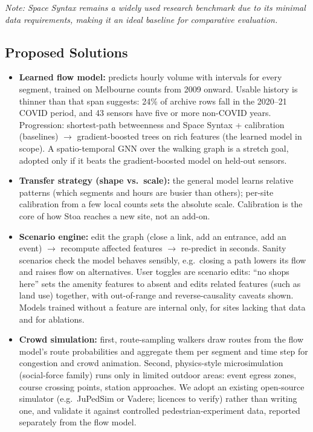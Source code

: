 \documentclass[11pt]{article}
\begin{document}
\textit{Note: Space Syntax remains a widely used research benchmark due to its minimal data requirements, making it an ideal baseline for comparative evaluation.}

\subsection{Proposed Solutions}
\begin{itemize}
  \item \textbf{Learned flow model:} predicts hourly volume with intervals for every segment, trained on Melbourne counts from 2009 onward. Usable history is thinner than that span suggests: 24\% of archive rows fall in the 2020--21 COVID period, and 43 sensors have five or more non-COVID years. Progression: shortest-path betweenness and Space Syntax + calibration (baselines) $\rightarrow$ gradient-boosted trees on rich features (the learned model in scope). A spatio-temporal GNN over the walking graph is a stretch goal, adopted only if it beats the gradient-boosted model on held-out sensors.
  \item \textbf{Transfer strategy (shape vs.\ scale):} the general model learns relative patterns (which segments and hours are busier than others); per-site calibration from a few local counts sets the absolute scale. Calibration is the core of how Stoa reaches a new site, not an add-on.
  \item \textbf{Scenario engine:} edit the graph (close a link, add an entrance, add an event) $\rightarrow$ recompute affected features $\rightarrow$ re-predict in seconds. Sanity scenarios check the model behaves sensibly, e.g.\ closing a path lowers its flow and raises flow on alternatives. User toggles are scenario edits: ``no shops here'' sets the amenity features to absent and edits related features (such as land use) together, with out-of-range and reverse-causality caveats shown. Models trained without a feature are internal only, for sites lacking that data and for ablations.
  \item \textbf{Crowd simulation:} first, route-sampling walkers draw routes from the flow model's route probabilities and aggregate them per segment and time step for congestion and crowd animation. Second, physics-style microsimulation (social-force family) runs only in limited outdoor areas: event egress zones, course crossing points, station approaches. We adopt an existing open-source simulator (e.g.\ JuPedSim or Vadere; licences to verify) rather than writing one, and validate it against controlled pedestrian-experiment data, reported separately from the flow model.

\end{itemize}
\end{document}
